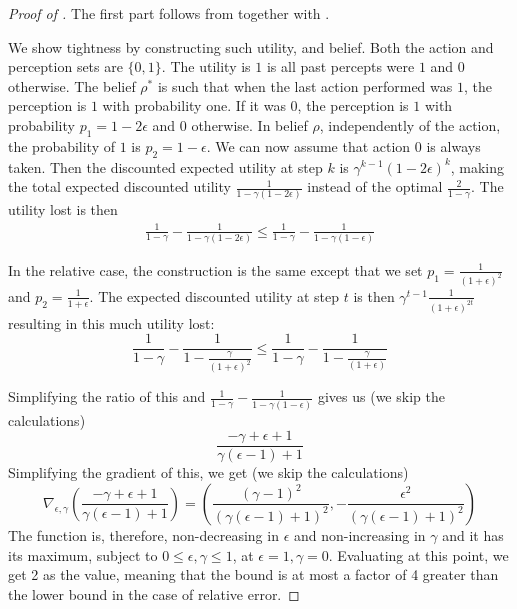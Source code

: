 \begin{proof}[Proof of ]
The first part follows from  together with .

We show tightness by constructing such utility, and belief. Both the action and perception sets are $\{0,1\}$. The utility is $1$ is all past percepts were $1$ and $0$ otherwise. The belief $\rho^*$ is such that when the last action performed was $1$, the perception is $1$ with probability one. If it was $0$, the perception is $1$ with probability $p_1 = 1-2\epsilon$ and $0$ otherwise. In belief $\rho$, independently of the action, the probability of $1$ is $p_2 = 1-\epsilon$. We can now assume that action $0$ is always taken. Then the discounted expected utility at step $k$ is $\gamma^{k-1} (1-2\epsilon)^k$, making the total expected discounted utility $\frac{1}{1- \gamma(1-2\epsilon)}$ instead of the optimal $\frac{2}{1-\gamma}$. The utility lost is then
\begin{gather}
\frac{1}{1-\gamma} - \frac{1}{1- \gamma(1-2\epsilon)} \leq \frac{1}{1-\gamma} - \frac{1}{1- \gamma(1-\epsilon)}
\end{gather}

In the relative case, the construction is the same except that we set $p_1 = \frac{1}{(1+\epsilon)^2}$ and $p_2 = \frac{1}{1+\epsilon}$. The expected discounted utility at step $t$ is then $\gamma^{t-1}\frac{1}{(1+\epsilon)^{2t}}$ resulting in this much utility lost:
\[
\frac{1}{1-\gamma} - \frac{1}{1- \frac{\gamma}{(1+\epsilon)^2}} \leq \frac{1}{1-\gamma} - \frac{1}{1- \frac{\gamma}{(1+\epsilon)}}
\]

Simplifying the ratio of this and $\frac{1}{1-\gamma} - \frac{1}{1- \gamma(1-\epsilon)}$ gives us (we skip the calculations)
\[
\frac{-\gamma +\epsilon +1}{\gamma  (\epsilon -1)+1}
\]
Simplifying the gradient of this, we get (we skip the calculations)
\[
\nabla_{\epsilon, \gamma} \left(\frac{-\gamma +\epsilon +1}{\gamma  (\epsilon -1)+1}\right) = \left(\frac{(\gamma -1)^2}{(\gamma  (\epsilon -1)+1)^2},-\frac{\epsilon ^2}{(\gamma  (\epsilon -1)+1)^2}\right)
\]
The function is, therefore, non-decreasing in $\epsilon$ and non-increasing in $\gamma$ and it has its maximum, subject to $0 \leq \epsilon, \gamma \leq 1$, at $\epsilon=1, \gamma=0$. Evaluating at this point, we get 2 as the value, meaning that the bound is at most a factor of 4 greater than the lower bound in the case of relative error. 
\end{proof}

